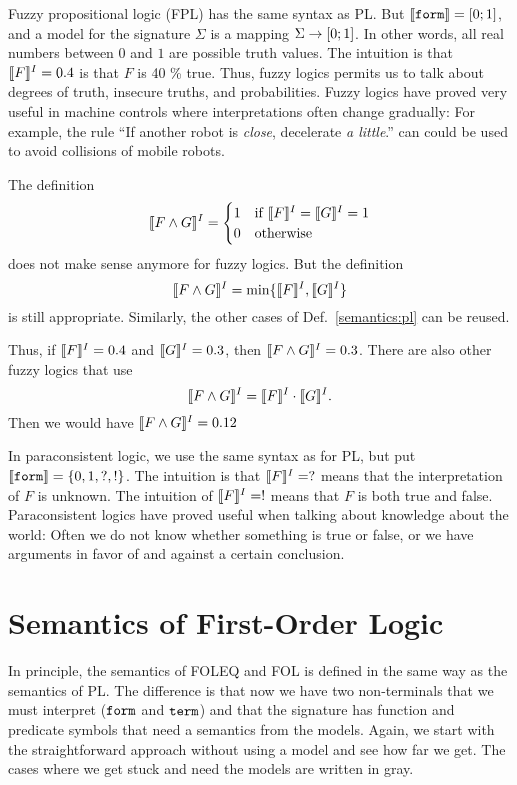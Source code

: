 \begin{example}
Fuzzy propositional logic (FPL) has the same syntax as PL. But $\llbracket \mathtt{form}\rrbracket=[0;1]$, and a model for the signature $\Sigma$ is a mapping $\Sigma\rightarrow[0;1]$. In other words, all real numbers between $0$ and $1$ are possible truth values. The intuition is that $\llbracket F\rrbracket^{I}=0.4$ is that $F$  is 40 \% true. Thus, fuzzy logics permits us to talk about degrees of truth, insecure truths, and probabilities. Fuzzy logics have proved very useful in machine controls where interpretations often change gradually: For example, the rule ``If another robot is \emph{close}, decelerate \emph{a little}.'' can could be used to avoid collisions of mobile robots.

The definition \[\llbracket F\wedge G\rrbracket^{I}=\begin{cases}1&\mathrm{if}\; \llbracket F\rrbracket^{I}=\llbracket G\rrbracket^{I}=1\\0&\mathrm{otherwise}\end{cases}\] does not make sense anymore for fuzzy logics. But the definition
\[\llbracket F\wedge G\rrbracket^{I}=\min\{\llbracket F\rrbracket^{I},\llbracket G\rrbracket^{I}\}\]
is still appropriate. Similarly, the other cases of Def.~\ref{semantics:pl} can be reused.

Thus, if $\llbracket F\rrbracket^{I}=0.4$ and $\llbracket G\rrbracket^{I}=0.3$, then $\llbracket F\wedge G\rrbracket^{I}=0.3$. There are also other fuzzy logics that use
\[\llbracket F\wedge G\rrbracket^{I}=\llbracket F\rrbracket^{I} \cdot\llbracket G\rrbracket^{I}.\]
Then we would have $\llbracket F\wedge G\rrbracket^{I}=0.12$
\end{example}

\begin{example}
In paraconsistent logic, we use the same syntax as for PL, but put $\llbracket \mathtt{form}\rrbracket=\{0,1,?,!\}$. The intuition is that $\llbracket F\rrbracket^{I}=?$ means that the interpretation of $F$ is unknown. The intuition of $\llbracket F\rrbracket^{I}=!$ means that $F$ is both true and false. Paraconsistent logics have proved useful when talking about knowledge about the world: Often we do not know whether something is true or false, or we have arguments in favor of and against a certain conclusion.
\end{example}


\section{Semantics of First-Order Logic}

In principle, the semantics of FOLEQ and FOL is defined in the same way as the semantics of PL. The difference is that now we have two non-terminals that we must interpret ($\mathtt{form}$ and $\mathtt{term}$) and that the signature has function and predicate symbols that need a semantics from the models. Again, we start with the straightforward approach without using a model and see how far we get. The cases where we get stuck and need the models are written in gray.

